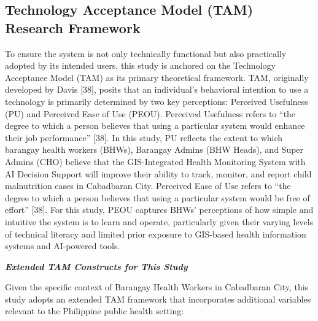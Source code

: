 \documentclass[12pt, a4paper]{report}
\begin{document}
\subsection{Technology Acceptance Model (TAM) Research Framework}
\label{subsec:tam_research}
To ensure the system is not only technically functional but also practically adopted by its intended users, this study is anchored on the Technology Acceptance Model (TAM) as its primary theoretical framework. TAM, originally developed by Davis [38], posits that an individual's behavioral intention to use a technology is primarily determined by two key perceptions: Perceived Usefulness (PU) and Perceived Ease of Use (PEOU).
Perceived Usefulness refers to ``the degree to which a person believes that using a particular system would enhance their job performance'' [38]. In this study, PU reflects the extent to which barangay health workers (BHWs), Barangay Admins (BHW Heads), and Super Admins (CHO) believe that the GIS-Integrated Health Monitoring System with AI Decision Support will improve their ability to track, monitor, and report child malnutrition cases in Cabadbaran City.
Perceived Ease of Use refers to ``the degree to which a person believes that using a particular system would be free of effort'' [38]. For this study, PEOU captures BHWs' perceptions of how simple and intuitive the system is to learn and operate, particularly given their varying levels of technical literacy and limited prior exposure to GIS-based health information systems and AI-powered tools.

\noindent \textbf{\textit{Extended TAM Constructs for This Study}}

Given the specific context of Barangay Health Workers in Cabadbaran City, this study adopts an extended TAM framework that incorporates additional variables relevant to the Philippine public health setting:
\end{document}
